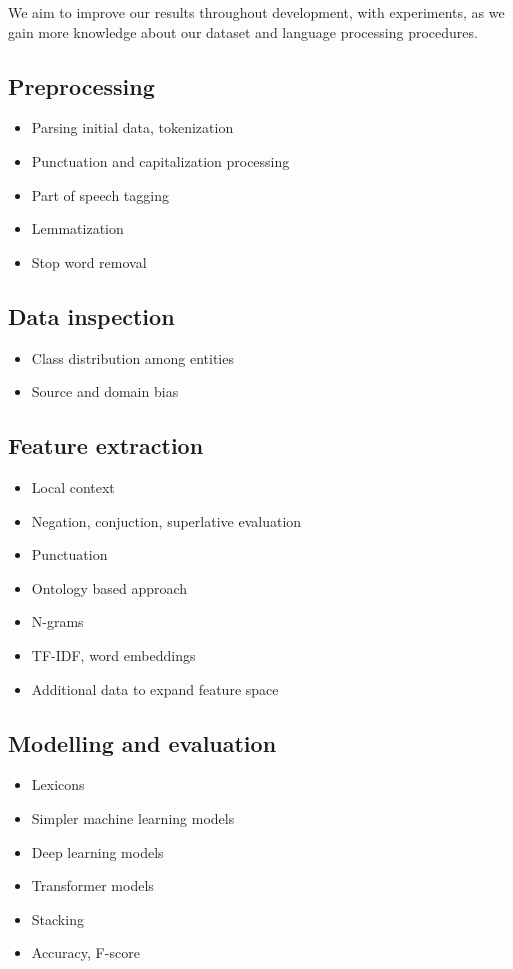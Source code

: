 \documentclass[11pt,a4paper]{article}
\begin{document}
We aim to improve our results throughout development, with experiments, as we gain more knowledge about our dataset and language processing procedures.

\subsection{Preprocessing}
\begin{itemize}
  \item Parsing initial data, tokenization
  \item Punctuation and capitalization processing
  \item Part of speech tagging
  \item Lemmatization
  \item Stop word removal
\end{itemize}

\subsection{Data inspection}
\begin{itemize}
  \item Class distribution among entities
  \item Source and domain bias
\end{itemize}

\subsection{Feature extraction}
\begin{itemize}
  \item Local context
  \item Negation, conjuction, superlative evaluation
  \item Punctuation
  \item Ontology based approach
  \item N-grams
  \item TF-IDF, word embeddings
  \item Additional data to expand feature space
\end{itemize}

\subsection{Modelling and evaluation}
\begin{itemize}
  \item Lexicons
  \item Simpler machine learning models
  \item Deep learning models
  \item Transformer models
  \item Stacking
  \item Accuracy, F-score
\end{itemize}
\end{document}
